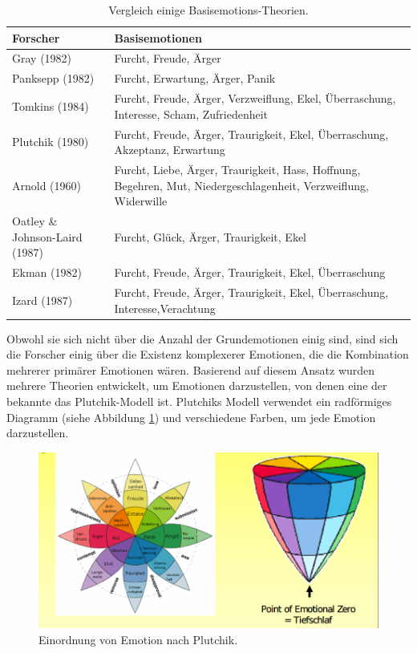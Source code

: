 \begin{table}[h] \centering
\begin{tabular}{| p{5cm} | p{11cm} |}
\hline
\textbf{Forscher} & \textbf{Basisemotionen} \\ \hline
Gray (1982) & Furcht, Freude, Ärger \\ \hline
Panksepp (1982) & Furcht, Erwartung, Ärger, Panik \\  \hline
Tomkins (1984) & Furcht, Freude, Ärger, Verzweiflung, Ekel, Überraschung, Interesse, Scham, Zufriedenheit \\  \hline
Plutchik (1980) & Furcht, Freude, Ärger, Traurigkeit, Ekel, Überraschung, Akzeptanz, Erwartung \\  \hline
Arnold (1960) & Furcht, Liebe, Ärger, Traurigkeit, Hass, Hoffnung, Begehren, Mut, Niedergeschlagenheit, Verzweiflung, Widerwille \\  \hline
Oatley \& Johnson-Laird (1987) & Furcht, Glück, Ärger, Traurigkeit, Ekel \\  \hline
Ekman (1982) & Furcht, Freude, Ärger, Traurigkeit, Ekel, Überraschung \\  \hline
Izard (1987) & Furcht, Freude, Ärger, Traurigkeit, Ekel, Überraschung, Interesse,Verachtung \\ \hline
\end{tabular} \caption[Vergleich einige Basisemotions-Theorien]{ Vergleich einige Basisemotions-Theorien\cite{basic_emotions_theories}. } \label{vergleich-basisemotionen}
\end{table}



Obwohl sie sich nicht über die Anzahl der Grundemotionen einig sind, sind sich die Forscher einig über die Existenz komplexerer Emotionen, die die Kombination mehrerer primärer Emotionen wären. 
Basierend auf diesem Ansatz wurden mehrere Theorien entwickelt, um Emotionen darzustellen, von denen eine der bekannte das Plutchik-Modell ist. 
Plutchiks Modell verwendet ein radförmiges Diagramm (siehe Abbildung \ref{plutchik}) und verschiedene Farben, um jede Emotion darzustellen. \\


\begin{figure}[h]
\includegraphics[width=\textwidth]{Images/plutchik.png} 
\vspace{-0.3cm} 
\caption{ Einordnung von Emotion nach Plutchik. }
\label{plutchik} 
\end{figure}


